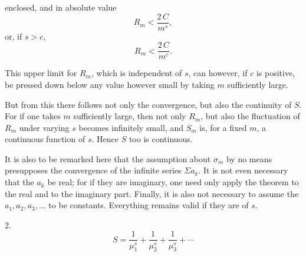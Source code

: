 enclosed, and in absolute value
\[
R_m < \frac{2\,C}{m^s},
\]
or, if $s > c$,
\[
R_m < \frac{2\,C}{m^c}.
\]

This upper limit for $R_m$, which is independent of $s$, can however, if $c$ is positive, be pressed down below any value however small by taking $m$ sufficiently large.

But from this there follows not only the convergence, but also the continuity of $S$. For if one takes $m$ sufficiently large, then not only $R_m$, but also the fluctuation of $R_m$ under varying $s$ becomes infinitely small, and $S_m$ is, for a fixed $m$, a continuous function of $s$. Hence $S$ too is continuous.

It is also to be remarked here that the assumption about $\sigma_m$ by no means presupposes the convergence of the infinite series $\Sigma a_k$. It is not even necessary that the $a_k$ be real; for if they are imaginary, one need only apply the theorem to the real and to the imaginary part. Finally, it is also not necessary to assume the $a_1, a_2, a_3, \dots$ to be constants. Everything remains valid if they are  of $s$.

2. 
\[
S = \frac{1}{\mu_1^s} + \frac{1}{\mu_2^s} + \frac{1}{\mu_3^s} + \cdots
\]
